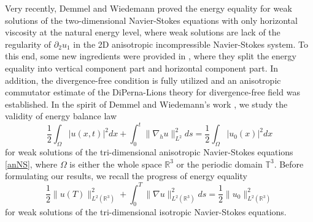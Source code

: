 \documentclass[11pt]{article}
\theoremstyle{plain}\newtheorem{definition}{Definition}[section]
\theoremstyle{definition}\newtheorem{theorem}{Theorem}[section]
\theoremstyle{plain}\newtheorem{lemma}[theorem]{Lemma}
\theoremstyle{plain}\newtheorem{coro}[theorem]{Corollary}
\theoremstyle{plain}\newtheorem{prop}[theorem]{Proposition}
\theoremstyle{remark}\newtheorem{remark}{Remark}[section]
\newcommand{\be}{\begin{equation}}
\newcommand{\ee}{\end{equation}}
\newcommand{\f}{\frac}
\numberwithin{equation}{section}
\begin{document}
Very recently, Demmel and   Wiedemann \cite{[DW]}  proved     the energy equality for  weak solutions of the two-dimensional Navier-Stokes equations with only horizontal viscosity   at the natural energy level,  where weak solutions are lack of the regularity of   $\partial_{2}u_{1}$ in the 2D anisotropic incompressible Navier-Stokes system.  To this end, some new ingredients were provided in \cite{[DW]}, where  they  split   the energy equality into vertical component part and  horizontal component part. In addition, the divergence-free condition is fully utilized and
  an   anisotropic  commutator estimate of the
DiPerna-Lions theory for divergence-free field  was established. In the spirit of Demmel and   Wiedemann's work \cite{[DW]}, we study the
validity of energy balance law
\begin{equation}\label{ei}
\f12\int_{\Omega}|u(x,t)|^{2}dx+\int_{0}^{t}\|\nabla_{h} u\|^{2}_{L^{2}}ds=\f12\int_{\Omega}|u_{0}(x)|^{2}dx
\end{equation}
for weak solutions of  the tri-dimensional anisotropic  Navier-Stokes equations \eqref{anNS}, where $\Omega$ is either the whole space $\mathbb{R}^{3}$ or the periodic domain $\mathbb{T}^{3}$.  Before formulating our results, we recall the progress of  energy equality
\be\label{EENS}
 \f12\|u(T)\|_{L^{2}(\mathbb{R}^{3})}^{2}+  \int_{0}^{T}\|\nabla u\|_{L^{2}(\mathbb{R}^{3})}^{2}ds=
  \f12\|u_0\|_{L^{2}(\mathbb{R}^{3})}^{2}
 \ee for weak solutions of  the tri-dimensional isotropic  Navier-Stokes equations.
\end{document}

